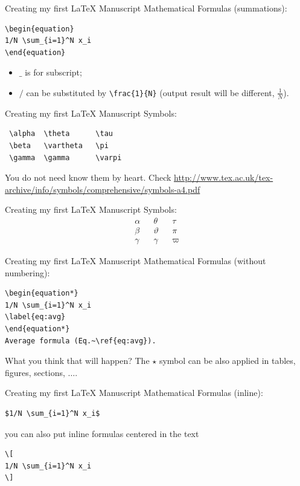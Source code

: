 \begin{frame}[fragile]{Creating my first \LaTeX{} Manuscript}
Mathematical Formulas (summations):
\scriptsize
\begin{verbatim}
\begin{equation}
1/N \sum_{i=1}^N x_i
\end{equation}
\end{verbatim}
\begin{itemize}
\item $\_$ is for subscript;
\item $/$ can be substituted by \verb!\frac{1}{N}! (output result will be different, $\frac{1}{N}$).
\end{itemize}
\end{frame}


\begin{frame}[fragile]{Creating my first \LaTeX{} Manuscript}
Symbols:
\begin{verbatim}
 \alpha  \theta      \tau          
 \beta   \vartheta   \pi     
 \gamma  \gamma      \varpi  
\end{verbatim}
You do not need know them by heart.
Check \url{http://www.tex.ac.uk/tex-archive/info/symbols/comprehensive/symbols-a4.pdf}
\end{frame}

\begin{frame}{Creating my first \LaTeX{} Manuscript}
Symbols:
\begin{align}
 \alpha & & \theta    &  & \tau\\
 \beta  & & \vartheta & & \pi \\   
 \gamma & & \gamma    & & \varpi
\end{align}
\end{frame}


\begin{frame}[fragile]{Creating my first \LaTeX{} Manuscript}
Mathematical Formulas (without numbering):
\scriptsize
\begin{verbatim}
\begin{equation*}
1/N \sum_{i=1}^N x_i
\label{eq:avg}
\end{equation*}
Average formula (Eq.~\ref{eq:avg}).
\end{verbatim}
\normalsize
What you think that will happen?
\pause
The $\star$ symbol can be also applied in tables, figures, sections, $\ldots$.
\end{frame}

\begin{frame}[fragile]{Creating my first \LaTeX{} Manuscript}
Mathematical Formulas (inline):
\scriptsize
\begin{verbatim}
$1/N \sum_{i=1}^N x_i$
\end{verbatim}
\normalsize
\pause
you can also put inline formulas centered in the text
\scriptsize
\begin{verbatim}
\[
1/N \sum_{i=1}^N x_i 
\]
\end{verbatim}
\end{frame}


